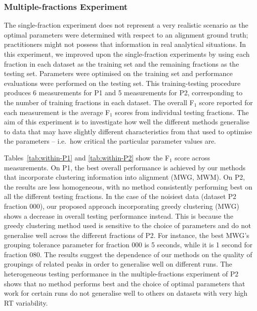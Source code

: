 \subsubsection{Multiple-fractions Experiment}

The single-fraction experiment does not represent a very realistic scenario as the optimal parameters were determined with respect to an alignment ground truth; practitioners might not possess that information in real analytical situations. In this experiment, we improved upon the single-fraction experiments by using each fraction in each dataset as the training set and the remaining fractions as the testing set. Parameters were optimised on the training set and performance evaluations were performed on the testing set. This training-testing procedure produces 6 measurements for P1 and 5 measurements for P2, corresponding to the number of training fractions in each dataset. The overall F$_1$ score reported for each measurement is the average F$_1$ scores from individual testing fractions. The aim of this experiment is to investigate how well the different methods generalise to data that may have slightly different characteristics from that used to optimise the parameters -- i.e.\ how critical the particular parameter values are.

Tables~\ref{tab:within-P1} and \ref{tab:within-P2} show the F$_{1}$ score across measurements. On P1, the best overall performance is achieved by our methods that incorporate clustering information into alignment (MWG, MWM). On P2, the results are less homogeneous, with no method consistently performing best on all the different testing fractions. In the case of the noisiest data (dataset P2 fraction 000), our proposed approach incorporating greedy clustering (MWG) shows a decrease in overall testing performance instead. This is because the greedy clustering method used is sensitive to the choice of parameters and do not generalise well across the different fractions of P2. For instance, the best MWG's grouping tolerance parameter for fraction 000 is 5 seconds, while it is 1 second for fraction 080. The results suggest the dependence of our methods on the quality of groupings of related peaks in order to generalise well on different runs. The heterogeneous testing performance in the multiple-fractions experiment of P2 shows that no method performs best and the choice of optimal parameters that work for certain runs do not generalise well to others on datasets with very high RT variability.

